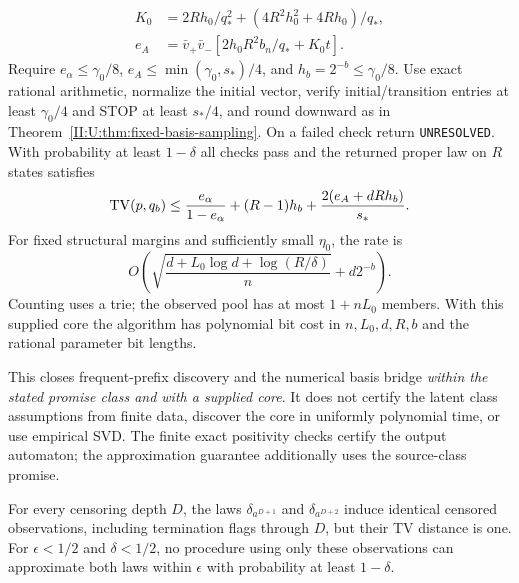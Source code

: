 \begin{theorem}
\begin{align*}
 K_0&=2Rh_0/q_*^2+(4R^2h_0^2+4Rh_0)/q_*,\\
 e_A&=\bar v_+\bar v_-
       [2h_0R^2b_n/q_*+K_0t].
\end{align*}
Require $e_\alpha\le\gamma_0/8$,
$e_A\le\min(\gamma_0,s_*)/4$, and $h_b=2^{-b}\le\gamma_0/8$.
Use exact rational arithmetic, normalize the initial vector, verify
initial/transition entries at least $\gamma_0/4$ and STOP at least
$s_*/4$, and round downward as in Theorem~\ref{II:U:thm:fixed-basis-sampling}.
On a failed check return \texttt{UNRESOLVED}.
With probability at least $1-\delta$ all checks pass and the returned
proper law on $R$ states satisfies
\begin{equation}
 \operatorname{TV}(p,q_b)\le\frac{e_\alpha}{1-e_\alpha}+(R-1)h_b
                    +\frac{2(e_A+dRh_b)}{s_*}.
 \label{II:U:eq:learned-basis-tv}
\end{equation}
For fixed structural margins and sufficiently small $\eta_0$, the rate is
\[
 O\!\left(\sqrt{\frac{d+L_0\log d+\log(R/\delta)}n}+d2^{-b}\right).
\]
Counting uses a trie; the observed pool has at most $1+nL_0$ members.
With this supplied core the algorithm has polynomial bit cost in
$n,L_0,d,R,b$ and the rational parameter bit lengths.
\end{theorem}

This closes frequent-prefix discovery and the numerical basis bridge
\emph{within the stated promise class and with a supplied core}.
It does not certify the latent class assumptions from finite data,
discover the core in uniformly polynomial time, or use empirical SVD.
The finite exact positivity checks certify the output automaton;
the approximation guarantee additionally uses the source-class promise.

\begin{proposition}
\label{II:U:prop:censored-obstruction}
For every censoring depth $D$, the laws $\delta_{a^{D+1}}$ and
$\delta_{a^{D+2}}$ induce identical censored observations, including
termination flags through $D$, but their TV distance is one.
For $\epsilon<1/2$ and $\delta<1/2$, no procedure using only these
observations can approximate both laws within $\epsilon$ with
probability at least $1-\delta$.
\end{proposition}


